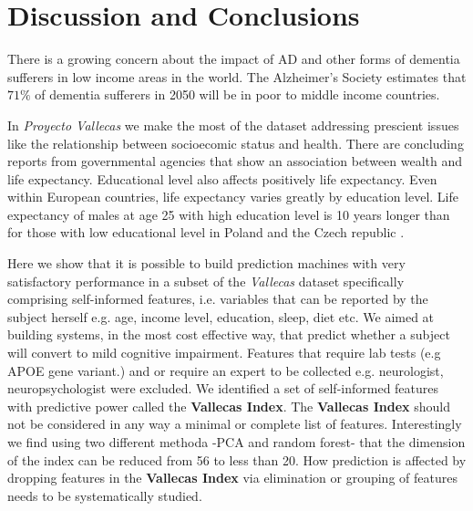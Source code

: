 \documentclass[11pt]{article}
\theoremstyle{definition}
\theoremstyle{remark}
\begin{document}
\section{Discussion and Conclusions}
\label{se:dis}

There is a growing concern about the impact of AD and other forms of dementia sufferers in low income areas in the world.
The Alzheimer’s Society estimates that $71\%$ of dementia sufferers in 2050 will be in poor to middle income countries.

In \emph{Proyecto Vallecas} we make the most of the dataset addressing prescient issues like the relationship between socioecomic status and health. There are concluding reports from governmental agencies that show an association between wealth and life expectancy. 
Educational level also affects positively life expectancy. Even within European countries, life expectancy varies greatly by education level. Life expectancy of males at age 25 with high education level is 10 years longer than for those with low educational level in Poland and the Czech republic \cite{imf2018}. 

Here we show that it is possible to build prediction machines with very satisfactory performance in a subset of the \emph{Vallecas} dataset specifically comprising self-informed features, i.e. variables that can be reported by the subject herself e.g. age, income level, education, sleep, diet etc. 
We aimed at building systems, in the most cost effective way, that predict whether a subject will convert to mild cognitive impairment. Features that require lab tests (e.g APOE gene variant.) and or require an expert to be collected e.g. neurologist, neuropsychologist were excluded. We identified a set of self-informed features with predictive power called the \textbf{Vallecas Index}. The \textbf{Vallecas Index} should not be considered in any way a minimal or complete list of features. Interestingly we find using two different methoda -PCA and random forest- that the dimension of the index can be reduced from 56 to less than 20. 
How prediction is affected by dropping features in the \textbf{Vallecas Index} via elimination or grouping of features needs to be systematically studied.
\end{document}
